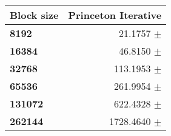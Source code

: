 \begin{tabular}{lr}\toprule
\textbf{Block size}  & \textbf{Princeton Iterative}\\\midrule
\textbf{8192}  & 21.1757 $\pm$ \\
\textbf{16384}  & 46.8150 $\pm$ \\
\textbf{32768}  & 113.1953 $\pm$ \\
\textbf{65536}  & 261.9954 $\pm$ \\
\textbf{131072}  & 622.4328 $\pm$ \\
\textbf{262144} & 1728.4640 $\pm$ \\
\bottomrule
\end{tabular}
